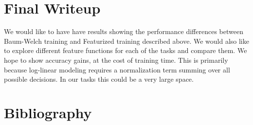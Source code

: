 \documentclass[11pt]{article}
\begin{document}
\section{Final Writeup}
We would like to have have results showing the performance differences between Baum-Welch training and Featurized training described above. We would also like to explore different feature functions for each of the tasks and compare them. We hope to show accuracy gains, at the cost of training time. This is primarily because log-linear modeling requires a normalization term summing over all possible decisions. In our tasks this could be a very large space. 

\section{Bibliography}


\end{document}
